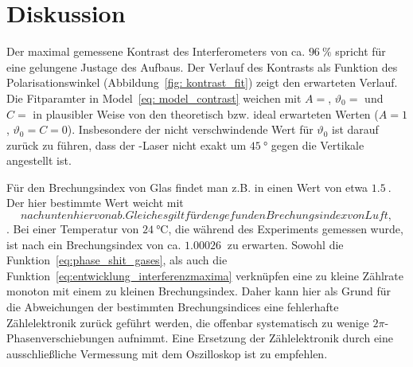 \newpage
\section{Diskussion}
Der maximal gemessene Kontrast des Interferometers von ca. $\SI{96}{\percent}$ spricht für 
eine gelungene Justage des Aufbaus. Der Verlauf des Kontrasts als Funktion des Polarisationswinkel 
(Abbildung~\ref{fig: kontrast_fit}) zeigt den erwarteten Verlauf. Die Fitparamter in Model~\eqref{eq: model_contrast} weichen mit 
$A = $, $\vartheta_0 = $ 
und $C = $ in plausibler Weise von den theoretisch bzw. ideal erwarteten Werten 
($A = 1$, $\vartheta_0 = C = 0$). Insbesondere 
der nicht verschwindende Wert für $\vartheta_0$ ist darauf zurück zu führen, dass der -Laser 
nicht exakt um $\SI{45}{\degree}$ gegen die Vertikale angestellt ist.

Für den Brechungsindex von Glas findet man z.B. in \cite{rii} einen Wert von etwa $\SI{1.5}{}$. Der hier bestimmte 
Wert weicht mit $$ nach unten hiervon ab. Gleiches gilt 
für den gefunden Brechungsindex von Luft, $$. Bei einer Temperatur von $\SI{24}{\celsius}$, die 
während des Experiments gemessen wurde, ist nach \cite{refr_index_air} ein Brechungsindex von ca. $\SI{1.00026}{}$ zu erwarten. Sowohl die 
Funktion~\eqref{eq:phase_shit_gases}, als auch die Funktion~\eqref{eq:entwicklung_interferenzmaxima} verknüpfen eine zu kleine Zählrate monoton mit einem zu kleinen 
Brechungsindex. Daher kann hier als Grund für die Abweichungen der bestimmten Brechungsindices eine 
fehlerhafte Zählelektronik zurück geführt werden, die offenbar systematisch zu wenige $2\pi$-Phasenverschiebungen aufnimmt. 
Eine Ersetzung der Zählelektronik durch eine ausschließliche Vermessung mit dem Oszilloskop ist zu empfehlen.
